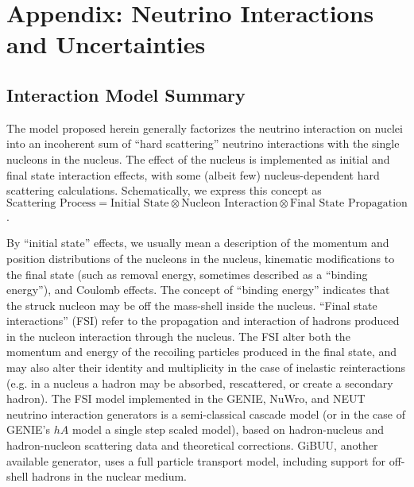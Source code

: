 \section{Appendix: Neutrino Interactions and Uncertainties}\label{sec:nu-osc-11} \label{sec:physics-lbnosc-nuint-app}


\subsection{Interaction Model Summary}

The model proposed herein generally factorizes the neutrino
interaction on nuclei into an incoherent sum of ``hard scattering'' neutrino interactions with the single nucleons in the nucleus. The effect of the nucleus is implemented as
initial and final state interaction effects, with some (albeit few) nucleus-dependent hard scattering calculations. Schematically, we express this concept as $\text{Scattering Process} = \text{Initial State} \otimes \text{Nucleon Interaction} \otimes \text{Final State Propagation}$.


By ``initial state'' effects, we usually mean a description of the momentum and position distributions of the nucleons in the nucleus, kinematic modifications to the final state (such as removal energy, sometimes described as a ``binding energy''), and Coulomb effects.   The concept of ``binding energy'' indicates that the struck nucleon may be off the mass-shell inside the nucleus.
``Final state interactions'' (FSI) refer to the propagation and interaction of hadrons produced in the nucleon interaction through the nucleus. The FSI alter both the momentum and energy of the recoiling particles produced in the final state, and may also alter their identity and multiplicity in the case of inelastic reinteractions (e.g. in a nucleus a hadron may be absorbed, rescattered, or create a secondary hadron).  The FSI model implemented in the GENIE, NuWro, and NEUT neutrino interaction generators is a semi-classical cascade model (or in the case of GENIE's $hA$ model a single step scaled model), based on hadron-nucleus and hadron-nucleon scattering data and theoretical corrections.  GiBUU, another available generator, uses a full particle transport model, including support for off-shell hadrons in the nuclear medium.

